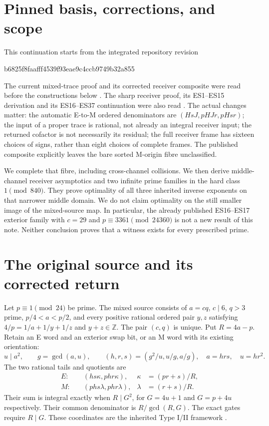 \section{Pinned basis, corrections, and scope}
This continuation starts from the integrated repository revision
\begin{center}\small\ttfamily b6825f8faafff4539f93eae9c4ccb9749b32a855\end{center}
The current mixed-trace proof and its corrected receiver composite were read
before the constructions below \citep{Mixed,Composite}. The sharp receiver
proof, its ES1--ES15 derivation and its ES16--ES37 continuation were also read
\citep{Sharp,EScont}. The actual changes matter: the automatic E-to-M
ordered denominators are $(HsJ,pHJr,pHsr)$; the input of a proper trace is
rational, not already an integral receiver input; the returned cofactor is
not necessarily its residual; the full receiver frame has sixteen choices
of signs, rather than eight choices of complete frames. The published
composite explicitly leaves the bare sorted M-origin fibre unclassified.

We complete that fibre, including cross-channel collisions. We then derive
middle-channel receiver asymptotics and two infinite prime families in the
hard class $1\pmod{840}$. They prove optimality of all three inherited inverse
exponents on that narrower middle domain. We do not claim optimality on the
still smaller image of the mixed-source map. In particular, the already
published ES16--ES17 exterior family with $c=29$ and
$p\equiv3361\pmod{24360}$ is not a new result of this note.
Neither conclusion proves that a witness exists for every prescribed prime.

\section{The original source and its corrected return}
Let $p\equiv1\pmod{24}$ be prime. The mixed source consists of
$a=cq$, $c\mid6$, $q>3$ prime, $p/4<a<p/2$, and every positive rational
ordered pair $y,z$ satisfying $4/p=1/a+1/y+1/z$ and $y+z\in\mathbb Z$.
The pair $(c,q)$ is unique. Put $R=4a-p$. Retain an E word and an exterior
swap bit, or an M word with its existing orientation:
\[
 u\mid a^2,\qquad g=\gcd(a,u),\qquad
 (h,r,s)=(g^2/u,u/g,a/g),\quad a=hrs,\quad u=hr^2.
\]
The two rational tails and quotients are
\begin{align}
 E:&\quad (hs\kappa,phr\kappa),&\kappa&=(pr+s)/R,\label{eq:Es}\tag{1E}\\
 M:&\quad (phs\lambda,phr\lambda),&\lambda&=(r+s)/R.\label{eq:Ms}\tag{1M}
\end{align}
Their sum is integral exactly when $R\mid G^2$, for $G=4u+1$ and $G=p+4u$
respectively. Their common denominator is $R/\gcd(R,G)$. The exact gates
require $R\mid G$. These coordinates are the inherited Type I/II framework
\citep[\S2, Propositions 2.2 and 2.6]{ET}.

